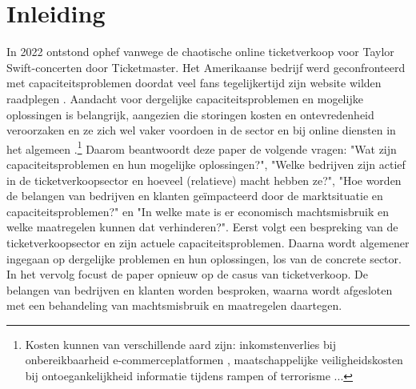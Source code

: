 
\section{Inleiding}

In 2022 ontstond ophef vanwege de chaotische online ticketverkoop voor 
Taylor Swift-concerten door Ticketmaster. Het Amerikaanse bedrijf werd
geconfronteerd met capaciteitsproblemen doordat veel fans tegelijkertijd
zijn website wilden raadplegen \cite{kelley2022senate,belga2022taylor}.
Aandacht voor dergelijke capaciteitsproblemen en mogelijke oplossingen
is belangrijk, aangezien die storingen kosten en ontevredenheid veroorzaken en
ze zich wel vaker voordoen in de sector \cite{sisario2023ticketmaster,
timsit2023its} en bij online diensten in het algemeen \cite{warren2023chatgpt, 
warren2020discord, reuters2023what}.\footnote{Kosten kunnen van verschillende
aard zijn: inkomstenverlies bij onbereikbaarheid e-commerceplatformen
\cite{guitart2007designing}, maatschappelijke veiligheidskosten bij
ontoegankelijkheid informatie tijdens rampen of terrorisme
\cite{andersson2006design} ...}
Daarom beantwoordt deze paper de volgende vragen:
"Wat zijn capaciteitsproblemen en hun mogelijke oplossingen?",
"Welke bedrijven zijn actief in de ticketverkoopsector en hoeveel (relatieve)
macht hebben ze?",
"Hoe worden de belangen van bedrijven en klanten
geïmpacteerd door de marktsituatie en capaciteitsproblemen?" en
"In welke mate is er economisch machtsmisbruik en welke maatregelen kunnen
dat verhinderen?".
Eerst volgt een bespreking van de ticketverkoopsector en
zijn actuele capaciteitsproblemen.
Daarna wordt algemener ingegaan op dergelijke problemen en hun oplossingen,
los van de concrete sector.
In het vervolg focust de paper opnieuw op de casus van ticketverkoop.
De belangen van bedrijven en klanten worden besproken,
waarna wordt afgesloten met een behandeling van machtsmisbruik en
maatregelen daartegen.